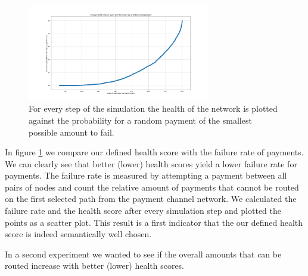 \documentclass[a4paper]{paper}
\begin{document}
\begin{figure}
 \centering
 \includegraphics[width=8cm]{code/results/routabilityTest/health vs payment rate.png}
 \caption{For every step of the simulation the health of the network is plotted against the probability for a random payment of the smallest possible amount to fail.}
 \label{fig:healthVsFailurerate}
\end{figure}
In figure \ref{fig:healthVsFailurerate} we compare our defined health score with the failure rate of payments.
We can clearly see that better (lower) health scores yield a lower failure rate for payments.
The failure rate is measured by attempting a payment between all pairs of nodes and count the relative amount of payments that cannot be routed on the first selected path from the payment channel network.
We calculated the failure rate and the health score after every simulation step and plotted the points as a scatter plot.
This result is a first indicator that the our defined health score is indeed semantically well chosen. 

In a second experiment we wanted to see if the overall amounts that can be routed increase with better (lower) health scores.
\end{document}
